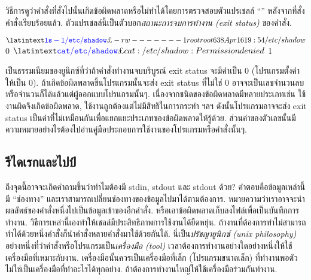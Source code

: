 \begin{thwbr}
วิธีการดูว่าคำสั่งที่สั่งไปนั้นเกิดข้อผิดพลาดหรือไม่ทำได้โดยการตรวจสอบตัวแปรเชลล์ ``'' หลังจากที่สั่งคำสั่งเรียบร้อยแล้ว. ตัวแปรเชลล์นี้เป็นตัวบอก\emph{สถานะการจบการทำงาน (exit status)} ของคำสั่ง.
\begin{MyExample}[การตรวจสอบสถานะการจบการกระทำ]
\begin{MyEx}
$ \cin{ls -l /etc/shadow}
-rw-------    1 root     root          638 Apr 16 19:54 /etc/shadow
$ 
0
$ \cin{cat /etc/shadow}
cat: /etc/shadow: Permission denied
$ 
1
\end{MyEx}
\end{MyExample}
เป็นธรรมเนียมของยูนิกซ์ที่ว่าถ้าคำสั่งทำงานจบบริบูรณ์ exit status จะมีค่าเป็น 0 (โปรแกรมตั้งค่าให้เป็น 0). ถ้าเกิดข้อผิดพลาดขึ้นโปรแกรมนั้นจะส่ง exit status ที่ไม่ใช่ 0 อาจจะเป็นเลขจำนวนลบหรือจำนวนก็ได้แล้วแต่ผู้ออกแบบโปรแกรมนั้นๆ. เนื่องจากชนิดของข้อผิดพลาดมีหลายประเภทเช่น ใช้งานผิดจึงเกิดข้อผิดพลาด, ใช้งานถูกต้องแต่ไม่มีสิทธิในการกระทำ ฯลฯ ดังนั้นโปรแกรมอาจจะส่ง exit status เป็นค่าที่ไม่เหมือนกันเพื่อแยกแยะประเภทของข้อผิดพลาดให้รู้ด้วย. ส่วนค่าของตัวเลขนั้นมีความหมายอย่างไรต้องไปอ่านคู่มือประกอบการใช้งานของโปรแกรมหรือคำสั่งนั้นๆ.
 

 

\subsection{รีไดเรกและไปป์}\label{sec:pipe}
ถึงจุดนี้อาจจะเกิดคำถามขึ้นว่าทำไมต้องมี stdin, stdout และ stdout ด้วย? คำตอบคือข้อมูลเหล่านี้มี ``ช่องทาง'' และเราสามารถเปลี่ยนช่องทางของข้อมูลไปมาได้ตามต้องการ. หมายความว่าเราอาจจะนำผลลัพธ์ของคำสั่งหนึ่งไปเป็นข้อมูลเข้าของอีกคำสั่ง. หรือเอาข้อผิดพลาดเก็บลงไฟล์เพื่อเป็นบันทึกการทำงาน. วิธีการเหล่านี้เองทำให้เชลล์มีประสิทธิภาพการใช้งานได้ยืดหยุ่น. ถ้างานที่ต้องการทำไม่สามารถทำได้ด้วยหนึ่งคำสั่งก็นำคำสั่งหลายคำสั่งมาใช้ด้วยกันได้. นี่เป็น\emph{ปรัชญายูนิกซ์ (unix philosophy)} อย่างหนึ่งที่ว่าคำสั่งหรือโปรแกรมเป็น\emph{เครื่องมือ (tool)} เวลาต้องการทำงานอย่างใดอย่างหนึ่งให้ใช้เครื่องมือที่เหมาะกับงาน. เครื่องมือนั้นควรเป็นเครื่องมือที่เล็ก (โปรแกรมขนาดเล็ก) ที่ทำงานพอตัวไม่ใช่เป็นเครื่องมือที่ทำอะไรได้ทุกอย่าง. ถ้าต้องการทำงานใหญ่ให้ใช้เครื่องมือร่วมกันทำงาน.

\begin{figure}[!htb]
\end{figure}


\end{thwbr}
